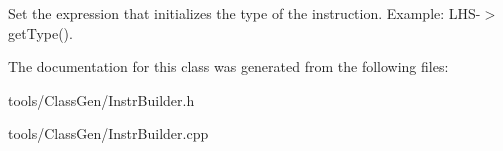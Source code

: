 Set the expression that initializes the type of the instruction. Example\+: \textquotesingle{}L\+H\+S-\/$>$get\+Type()\textquotesingle{}. 

The documentation for this class was generated from the following files\+:\begin{DoxyCompactItemize}
\item 
tools/\+Class\+Gen/Instr\+Builder.\+h\item 
tools/\+Class\+Gen/Instr\+Builder.\+cpp\end{DoxyCompactItemize}
